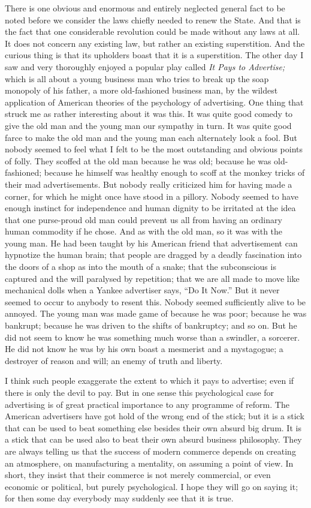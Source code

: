\documentclass{book}
\begin{document}
There is one obvious and enormous and entirely neglected general fact to be noted before we consider the laws chiefly needed to renew the State. And that is the fact that one considerable revolution could be made without any laws at all. It does not concern any existing law, but rather an existing superstition. And the curious thing is that its upholders boast that it is a superstition. The other day I saw and very thoroughly enjoyed a popular play called \emph{It Pays to Advertise;} which is all about a young business man who tries to break up the soap monopoly of his father, a more old-fashioned business man, by the wildest application of American theories of the psychology of advertising. One thing that struck me as rather interesting about it was this. It was quite good comedy to give the old man and the young man our sympathy in turn. It was quite good farce to make the old man and the young man each alternately look a fool. But nobody seemed to feel what I felt to be the most outstanding and obvious points of folly. They scoffed at the old man because he was old; because he was old-fashioned; because he himself was healthy enough to scoff at the monkey tricks of their mad advertisements. But nobody really criticized him for having made a corner, for which he might once have stood in a pillory. Nobody seemed to have enough instinct for independence and human dignity to be irritated at the idea that one purse-proud old man could prevent us all from having an ordinary human commodity if he chose. And as with the old man, so it was with the young man. He had been taught by his American friend that advertisement can hypnotize the human brain; that people are dragged by a deadly fascination into the doors of a shop as into the mouth of a snake; that the subconscious is captured and the will paralysed by repetition; that we are all made to move like mechanical dolls when a Yankee advertiser says, “Do It Now.” But it never seemed to occur to anybody to resent this. Nobody seemed sufficiently alive to be annoyed. The young man was made game of because he was poor; because he was bankrupt; because he was driven to the shifts of bankruptcy; and so on. But he did not seem to know he was something much worse than a swindler, a sorcerer. He did not know he was by his own boast a mesmerist and a mystagogue; a destroyer of reason and will; an enemy of truth and liberty.

I think such people exaggerate the extent to which it pays to advertise; even if there is only the devil to pay. But in one sense this psychological case for advertising is of great practical importance to any programme of reform. The American advertisers have got hold of the wrong end of the stick; but it is a stick that can be used to beat something else besides their own absurd big drum. It is a stick that can be used also to beat their own absurd business philosophy. They are always telling us that the success of modern commerce depends on creating an atmosphere, on manufacturing a mentality, on assuming a point of view. In short, they insist that their commerce is not merely commercial, or even economic or political, but purely psychological. I hope they will go on saying it; for then some day everybody may suddenly see that it is true.
\end{document}
